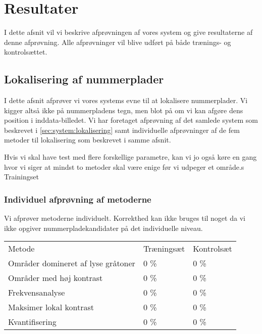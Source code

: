 \section{Resultater}
\label{sec:resultater}

I dette afsnit vil vi beskrive afprøvningen af vores system og give resultaterne af denne afprøvning. Alle afprøvninger vil blive udført på både trænings- og kontrolsættet.


\subsection{Lokalisering af nummerplader}
I dette afsnit afprøver vi vores systems evne til at lokalisere nummerplader. Vi kigger altså ikke på nummerpladens tegn, men blot på om vi kan afgøre dens position i inddata-billedet. Vi har foretaget afprøvning af det samlede system som beskrevet i \vref{sec:system:lokalisering} samt individuelle afprøvninger af de fem metoder til lokalisering som beskrevet i samme afsnit.

Hvis vi skal have test med flere forskellige parametre, kan vi jo også køre en gang hvor vi siger at mindst to metoder skal være enige før vi udpeger et område.s
Trainingset


\subsubsection{Individuel afprøvning af metoderne}
Vi afprøver metoderne individuelt. Korrekthed kan ikke bruges til noget da vi ikke opgiver nummerpladekandidater på det individuelle niveau.
\begin{center}
\begin{tabular}{|l|l|l|}
\hline
\rowcolor[gray]{0.9} \multicolumn{3}{|>{\columncolor[gray]{0.9}}c|}{\textbf{..}} \\ \hline
Metode & Træningsæt & Kontrolsæt\\ \hline
Områder domineret af lyse gråtoner &  0 \% & 0 \%\\ \hline
Områder med høj kontrast &  0 \% & 0 \%\\ \hline
Frekvensanalyse &  0 \% & 0 \%\\ \hline
Maksimer lokal kontrast &  0 \% & 0 \%\\ \hline
Kvantifisering &  0 \% & 0 \%\\
\hline
\end{tabular}
\end{center}


